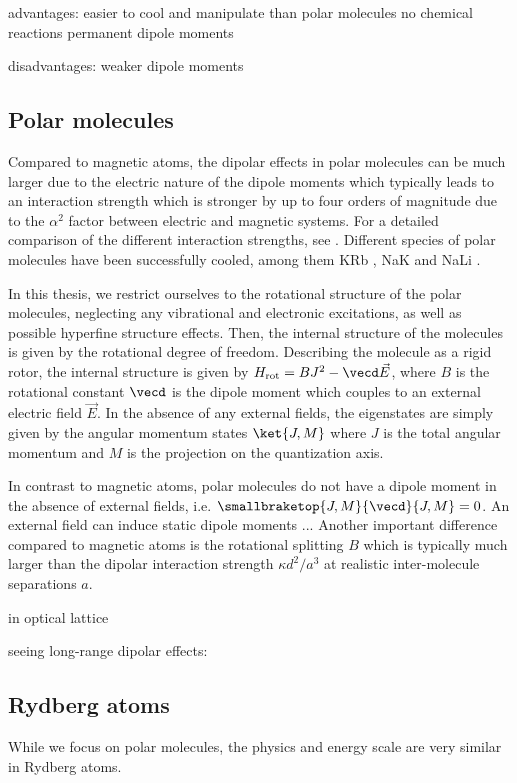 advantages:
easier to cool and manipulate than polar molecules
no chemical reactions
permanent dipole moments

disadvantages:
weaker dipole moments

\subsection{Polar molecules}

Compared to magnetic atoms, the dipolar effects in polar molecules
can be much larger due to the electric nature of the dipole moments
which typically leads to an interaction strength which is stronger by
up to four orders of magnitude due to the $\alpha^2$ factor between
electric and magnetic systems. For a detailed comparison of the
different interaction strengths, see \cite{}.
Different species of polar molecules have been successfully cooled,
among them KRb \cite{Ni2008b,Ospelkaus2010}, NaK \cite{Wu2012a} and NaLi \cite{Heo2012}.

In this thesis, we restrict ourselves to the rotational structure of the
polar molecules, neglecting any vibrational and electronic excitations,
as well as possible hyperfine structure effects. Then, the internal
structure of the molecules is given by the rotational degree of freedom.
Describing the molecule as a rigid rotor, the internal structure is
given by $H_\text{rot}=B J^2 - \vecd \vec{E}$, where $B$ is the rotational
constant $\vecd$ is the dipole moment which couples to an external
electric field $\vec{E}$. In the absence of any external fields, the
eigenstates are simply given by the angular momentum states $\ket{J,M}$
where $J$ is the total angular momentum and $M$ is the projection on the
quantization axis.

In contrast to magnetic atoms, polar molecules do not have a dipole moment
in the absence of external fields, i.e. $\smallbraketop{J,M}{\vecd}{J,M}=0$.
An external field can induce static dipole moments ... %
Another important difference compared to magnetic atoms is the rotational splitting $B$
which is typically much larger than the dipolar interaction strength $\kappa d^2/a^3$
at realistic inter-molecule separations $a$.

in optical lattice \cite{Chotia2012}

seeing long-range dipolar effects:
\cite{Yan2013}


\subsection{Rydberg atoms}
While we focus on polar molecules, the physics and energy scale are very similar
in Rydberg atoms.

